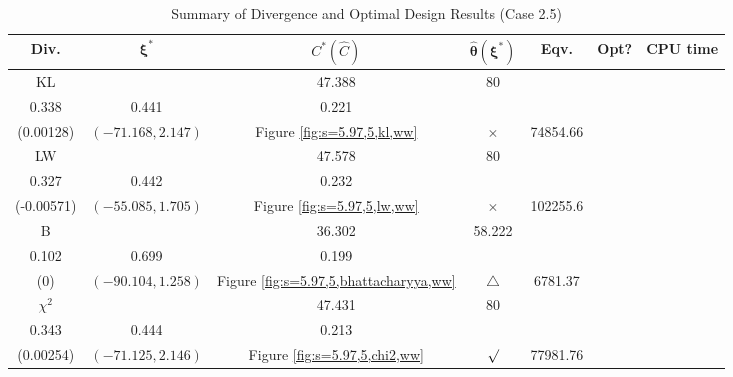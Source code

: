 \documentclass[12pt, a4paper]{article}
\begin{document}
\begin{table}[H]
\centering
\renewcommand{\arraystretch}{1.5} %
\setlength{\tabcolsep}{8pt} %
\begin{tabular}{|c|c|c|c|c|c|c|}
\hline
\textbf{Div.} & \(\boldsymbol{\xi^*}\) & \(C^* (\hat{C})\) & \(\boldsymbol{\hat{\theta}(\xi^*)}\) & \textbf{Eqv.} & \textbf{Opt?} & \textbf{CPU time} \\
\hline
KL & \(\left\{\begin{array}{ccc}
10 & 47.388 & 80 \\
0.338 & 0.441 & 0.221
\end{array}\right\}\) &
\(\begin{array}{c}
0.00128 \\
(0.00128)
\end{array}\) & 
\((-71.168, 2.147)\) & 
Figure \ref{fig:s=5.97,5,kl,ww} & $\times$ & 74854.66 \\
\hline
LW & \(\left\{\begin{array}{ccc}
10 & 47.578 & 80 \\
0.327 & 0.442 & 0.232
\end{array}\right\}\) &
\(\begin{array}{c}
0.000321 \\
(-0.00571)
\end{array}\) & 
\((-55.085, 1.705)\) & 
Figure \ref{fig:s=5.97,5,lw,ww} & $\times$ & 102255.6 \\
\hline
B & \(\left\{\begin{array}{ccc}
19.892 & 36.302 & 58.222 \\
0.102 & 0.699 & 0.199
\end{array}\right\}\) &
\(\begin{array}{c}
0 \\
(0)
\end{array}\) & 
\((-90.104, 1.258)\) & 
Figure \ref{fig:s=5.97,5,bhattacharyya,ww} & $\triangle$ & 6781.37 \\
\hline
\(\chi^2\) & \(\left\{\begin{array}{ccc}
10 & 47.431 & 80 \\
0.343 & 0.444 & 0.213
\end{array}\right\}\) &
\(\begin{array}{c}
0.00254 \\
(0.00254)
\end{array}\) & 
\((-71.125, 2.146)\) & 
Figure \ref{fig:s=5.97,5,chi2,ww} & $\surd$ & 77981.76 \\
\hline
\end{tabular}
\caption{Summary of Divergence and Optimal Design Results (Case 2.5)}
\label{tab:results2.5}
\end{table}
\end{document}
